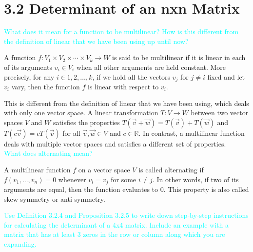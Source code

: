 \documentclass[fontsize=12pt]{scrartcl}
\begin{document}
\newpage

\section{3.2 Determinant of an nxn Matrix}

\bigskip

\noindent
\textcolor{cyan}{What does it mean for a function to be multilinear? How is this different from the definition of linear that we have been using up until now?}

\noindent
A function $f:V_1 \times V_2 \times \cdots \times V_k \rightarrow W$ is said to be multilinear if it is linear in each of its arguments $v_i \in V_i$ when all other arguments are held constant. More precisely, for any $i \in {1,2,\ldots,k}$, if we hold all the vectors $v_j$ for $j \neq i$ fixed and let $v_i$ vary, then the function $f$ is linear with respect to $v_i$.

\noindent
This is different from the definition of linear that we have been using, which deals with only one vector space. A linear transformation $T:V \rightarrow W$ between two vector spaces $V$ and $W$ satisfies the properties $T(\vec{v} + \vec{w}) = T(\vec{v}) + T(\vec{w})$ and $T(c\vec{v}) = cT(\vec{v})$ for all $\vec{v},\vec{w} \in V$ and $c \in \mathbb{R}$. In contrast, a multilinear function deals with multiple vector spaces and satisfies a different set of properties.
\\

\noindent
\textcolor{cyan}{What does alternating mean?}

\noindent
A multilinear function $f$ on a vector space $V$ is called alternating if $f(v_1,\ldots,v_n)=0$ whenever $v_i=v_j$ for some $i\neq j$. In other words, if two of its arguments are equal, then the function evaluates to 0. This property is also called skew-symmetry or anti-symmetry.

\newpage

\noindent
\textcolor{cyan}{Use Definition 3.2.4 and Proposition 3.2.5 to write down step-by-step instructions for calculating the determinant of a 4x4 matrix. Include an example with a matrix that has at least 3 zeros in the row or column along which you are expanding.}
\end{document}

